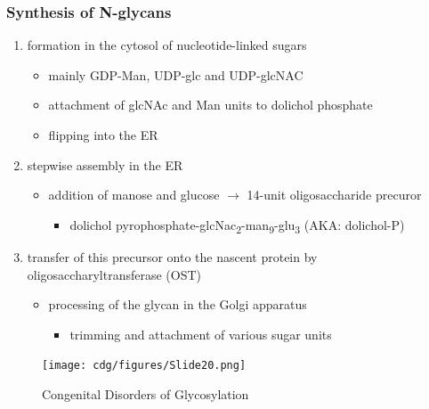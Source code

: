\documentclass[12pt]{scrartcl}
\begin{document}
\subsubsection{Synthesis of N-glycans}
\label{sec:org729a3de}
\begin{enumerate}
\item formation in the cytosol of nucleotide-linked sugars
\begin{itemize}
\item mainly GDP-Man, UDP-glc and UDP-glcNAC
\item attachment of glcNAc and Man units to dolichol phosphate
\item flipping into the ER
\end{itemize}
\item stepwise assembly in the ER
\begin{itemize}
\item addition of manose and glucose \(\to\) 14-unit oligosaccharide precuror
\begin{itemize}
\item dolichol pyrophosphate-glcNac\textsubscript{2}-man\textsubscript{9}-glu\textsubscript{3} (AKA: dolichol-P)
\end{itemize}
\end{itemize}
\item transfer of this precursor onto the nascent protein by
oligosaccharyltransferase (OST)
\begin{itemize}
\item processing of the glycan in the Golgi apparatus
\begin{itemize}
\item trimming and attachment of various sugar units
\end{itemize}
\end{itemize}
\end{enumerate}

\begin{figure}[htbp]
\centering
\texttt{[image: cdg/figures/Slide20.png]}
\caption{\label{fig:orge95ef27}Congenital Disorders of Glycosylation}
\end{figure}
\end{document}
